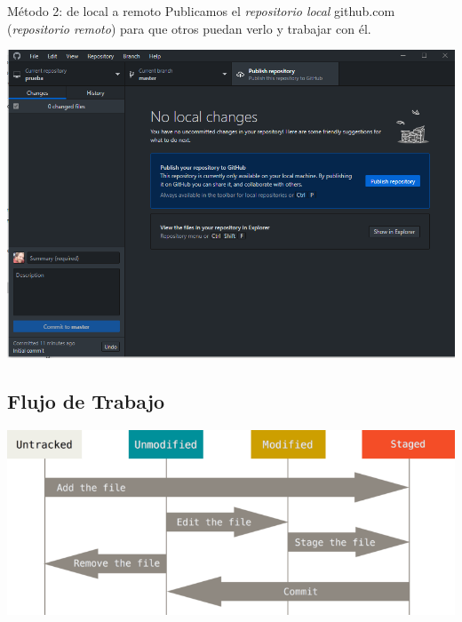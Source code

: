 \documentclass[aspectratio=169, xcolor={usenames,svgnames,dvipsnames}]{beamer}
\begin{document}
\begin{frame}[label={sec:org996c3ef}]{Método 2: de local a remoto}
Publicamos el \emph{repositorio local} github.com (\emph{repositorio remoto}) para que otros puedan verlo y trabajar con él.

\begin{center}
\includegraphics[width=.9\linewidth]{figs/Desktop_PublishRepository.png}
\end{center}
\end{frame}


\subsection{Flujo de Trabajo}
\label{sec:org112b4df}
\begin{frame}[label={sec:org6f7a66d}]{}
\begin{center}
\includegraphics[width=.9\linewidth]{figs/git_estados.png}
\end{center}
\end{frame}
\end{document}
